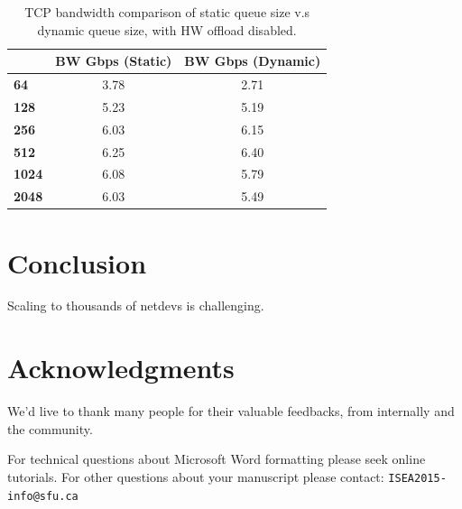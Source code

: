 \documentclass[letterpaper]{article}
\begin{document}
\begin{table}[h!]
\centering
\footnotesize
\begin{tabular}{|l|c|c|}
\hline
\textbf{} & \textbf{BW Gbps (Static)} & \textbf{BW Gbps (Dynamic)} \\ \hline
\textbf{64}   & 3.78 & 2.71 \\ \hline
\textbf{128}  & 5.23 & 5.19 \\ \hline
\textbf{256}  & 6.03 & 6.15 \\ \hline
\textbf{512}  & 6.25 & 6.40  \\ \hline
\textbf{1024} & 6.08 & 5.79 \\ \hline
\textbf{2048} & 6.03 & 5.49 \\ \hline
\end{tabular}
\caption{TCP bandwidth comparison of static queue size v.s dynamic queue size, with HW offload disabled.}
\label{tab:iperf}
\end{table}



\section{Conclusion}
Scaling to thousands of netdevs is challenging.



\section{Acknowledgments}
We'd live to thank many people for their valuable feedbacks, from internally and the community.


For technical questions about Microsoft Word formatting please seek online tutorials. For other questions about your manuscript please contact: {\tt ISEA2015-info@sfu.ca}




\end{document}

